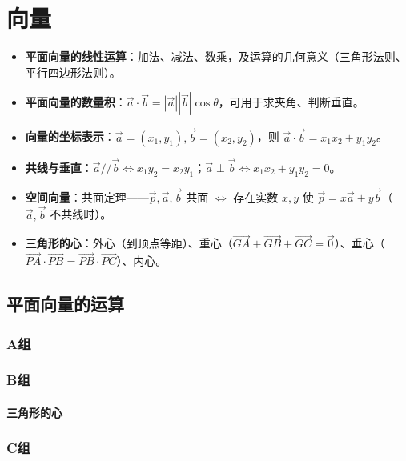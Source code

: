 \chapter{向量}

\begin{knowledgeframe}
\begin{itemize}
	\item \textbf{平面向量的线性运算}：加法、减法、数乘，及运算的几何意义（三角形法则、平行四边形法则）。
	\item \textbf{平面向量的数量积}：$\vec{a}\cdot\vec{b}=|\vec{a}||\vec{b}|\cos\theta$，可用于求夹角、判断垂直。
	\item \textbf{向量的坐标表示}：$\vec{a}=(x_1,y_1), \vec{b}=(x_2,y_2)$，则 $\vec{a}\cdot\vec{b}=x_1x_2+y_1y_2$。
	\item \textbf{共线与垂直}：$\vec{a}//\vec{b} \iff x_1y_2=x_2y_1$；$\vec{a}\perp\vec{b} \iff x_1x_2+y_1y_2=0$。
	\item \textbf{空间向量}：共面定理——$\vec{p},\vec{a},\vec{b}$ 共面 $\iff$ 存在实数 $x,y$ 使 $\vec{p}=x\vec{a}+y\vec{b}$（$\vec{a},\vec{b}$ 不共线时）。
	\item \textbf{三角形的心}：外心（到顶点等距）、重心（$\overrightarrow{GA}+\overrightarrow{GB}+\overrightarrow{GC}=\vec{0}$）、垂心（$\overrightarrow{PA}\cdot\overrightarrow{PB}=\overrightarrow{PB}\cdot\overrightarrow{PC}$）、内心。
\end{itemize}
\end{knowledgeframe}

\section{平面向量的运算}

\startexercise

\subsection*{A组}





\subsection*{B组}





\subsubsection*{三角形的心}



\subsection*{C组}




\stopexercise
